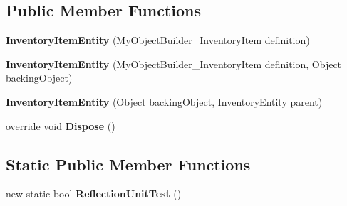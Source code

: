 \subsection*{Public Member Functions}
\begin{DoxyCompactItemize}
\item 
\hypertarget{class_s_e_mod_a_p_i_internal_1_1_a_p_i_1_1_entity_1_1_inventory_item_entity_a977f0233261d91ae5e2ed2de6509890a}{}{\bfseries Inventory\+Item\+Entity} (My\+Object\+Builder\+\_\+\+Inventory\+Item definition)\label{class_s_e_mod_a_p_i_internal_1_1_a_p_i_1_1_entity_1_1_inventory_item_entity_a977f0233261d91ae5e2ed2de6509890a}

\item 
\hypertarget{class_s_e_mod_a_p_i_internal_1_1_a_p_i_1_1_entity_1_1_inventory_item_entity_a51485f682b0118739a2254c208e68b8a}{}{\bfseries Inventory\+Item\+Entity} (My\+Object\+Builder\+\_\+\+Inventory\+Item definition, Object backing\+Object)\label{class_s_e_mod_a_p_i_internal_1_1_a_p_i_1_1_entity_1_1_inventory_item_entity_a51485f682b0118739a2254c208e68b8a}

\item 
\hypertarget{class_s_e_mod_a_p_i_internal_1_1_a_p_i_1_1_entity_1_1_inventory_item_entity_a1b9113ad2c92f8a27138630aa4123d9e}{}{\bfseries Inventory\+Item\+Entity} (Object backing\+Object, \hyperlink{class_s_e_mod_a_p_i_internal_1_1_a_p_i_1_1_entity_1_1_inventory_entity}{Inventory\+Entity} parent)\label{class_s_e_mod_a_p_i_internal_1_1_a_p_i_1_1_entity_1_1_inventory_item_entity_a1b9113ad2c92f8a27138630aa4123d9e}

\item 
\hypertarget{class_s_e_mod_a_p_i_internal_1_1_a_p_i_1_1_entity_1_1_inventory_item_entity_ab0a02729f4438a674520e29e595732e5}{}override void {\bfseries Dispose} ()\label{class_s_e_mod_a_p_i_internal_1_1_a_p_i_1_1_entity_1_1_inventory_item_entity_ab0a02729f4438a674520e29e595732e5}

\end{DoxyCompactItemize}
\subsection*{Static Public Member Functions}
\begin{DoxyCompactItemize}
\item 
\hypertarget{class_s_e_mod_a_p_i_internal_1_1_a_p_i_1_1_entity_1_1_inventory_item_entity_ab93e298064fc9666ccf3920b28117f5c}{}new static bool {\bfseries Reflection\+Unit\+Test} ()\label{class_s_e_mod_a_p_i_internal_1_1_a_p_i_1_1_entity_1_1_inventory_item_entity_ab93e298064fc9666ccf3920b28117f5c}

\end{DoxyCompactItemize}

